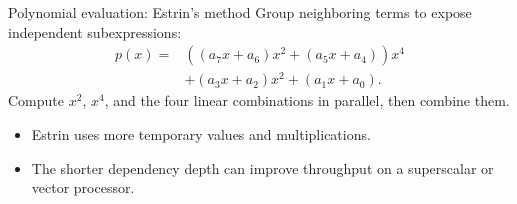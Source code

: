 \documentclass[aspectratio=169,11pt]{beamer}
\begin{document}
\begin{frame}{Polynomial evaluation: Estrin's method}
\small
Group neighboring terms to expose independent subexpressions:
\[
\begin{aligned}
p(x)={}&((a_7x+a_6)x^2+(a_5x+a_4))x^4\\
       &+(a_3x+a_2)x^2+(a_1x+a_0).
\end{aligned}
\]
Compute $x^2$, $x^4$, and the four linear combinations in parallel, then
combine them.
\begin{itemize}
  \item Estrin uses more temporary values and multiplications.
  \item The shorter dependency depth can improve throughput on a superscalar
        or vector processor.
\end{itemize}
\end{frame}
\end{document}
